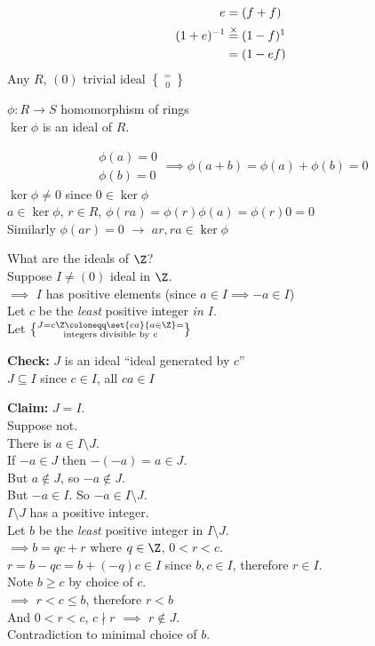 \vspace{-\baselineskip}
\begin{align*}
e &= (f+f) \\
(1+e)^{-1} &\overset{\times}{=} (1-f)\footnotemark \\
&= (1-ef)
\end{align*}%
%
\ex Any $R$, $(0)$ trivial ideal $=\brace0$

\ex $\phi\colon R\to S$ homomorphism of rings \\
$\ker\phi$ is an ideal of $R$.

\pf
\[ \begin{gathered}
\phi(a) = 0 \\
\phi(b) = 0
\end{gathered} \implies \phi(a+b)=\phi(a)+\phi(b)=0 \]
$\ker\phi\neq0$ since $0\in\ker\phi$ \\
$a\in\ker\phi$, $r\in R$, $\phi(ra)=\phi(r)\phi(a)=\phi(r)0=0$ \\
Similarly $\phi(ar)=0$ $\longrightarrow$ $ar,ra\in\ker\phi$

\ex What are the ideals of $\Z$? \\
Suppose $I\neq(0)$ ideal in $\Z$. \\
$\implies$ $I$ has positive elements (since $a\in I\implies -a\in I$) \\
Let $c$ be the \emph{least} positive integer \emph{in $I$}. \\
Let $J=c\Z\coloneqq\set{ca}{a\in\Z}=\brace{\text{integers divisible by $c$}}$

\textbf{Check:} $J$ is an ideal ``ideal generated by $c$'' \\
$J\subseteq I$ since $c\in I$, all $ca\in I$

\textbf{Claim:} $J=I$. \\
\pf Suppose not. \\
There is $a\in I\setminus J$. \\
If $-a\in J$ then $-(-a)=a\in J$. \\
But $a\notin J$, so $-a\notin J$. \\
But $-a\in I$.  So $-a\in I\setminus J$. \\
$I\setminus J$ has a positive integer. \\
Let $b$ be the \emph{least} positive integer in $I\setminus J$. \\
$\implies b=qc+r$ where $q\in\Z$, $0<r<c$. \\
$r=b-qc=b+(-q)c\in I$ since $b,c\in I$, therefore $r\in I$. \\
Note $b\geq c$ by choice of $c$. \\
$\implies$ $r<c\leq b$, therefore $r<b$ \\
And $0<r<c$, $c\nmid r$ $\implies$ $r\notin J$. \\
Contradiction to minimal choice of $b$.

